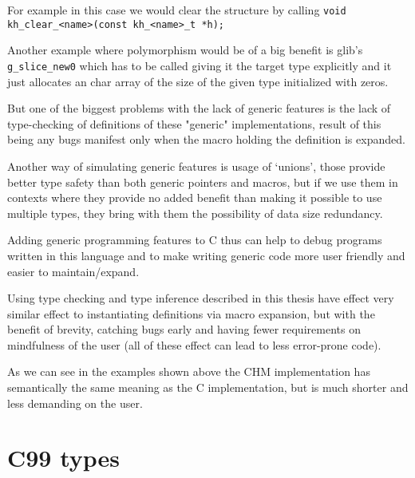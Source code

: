 For example in this case we would clear the structure by calling
\lstinline{void kh_clear_<name>(const kh_<name>_t *h);}

Another example where polymorphism would be of a big benefit is glib's %
\lstinline{g_slice_new0} which has to be called giving it the target type explicitly and it just
allocates an char array of the size of the given type initialized with zeros.


But one of the biggest problems with the lack of generic features is the lack of type-checking
of definitions of these "generic" implementations, result of this being any bugs manifest only
when the macro holding the definition is expanded.

Another way of simulating generic features is usage of `unions', those provide better type safety
than both generic pointers and macros, but if we use them in contexts where they provide no added benefit
than making it possible to use multiple types, they bring with them the possibility of data size redundancy.

Adding generic programming features to C thus can help to debug programs written in this language and
to make writing generic code more user friendly and easier to maintain/expand. %


Using type checking and type inference described in this thesis have effect very similar effect to instantiating
definitions via macro expansion, but with the benefit of brevity, catching bugs early and having fewer
requirements on mindfulness of the user (all of these effect can lead to less error-prone code).


As we can see in the examples shown above the CHM implementation has semantically the same meaning as the C
implementation, but is much shorter and less demanding on the user.


\section{C99 types}


